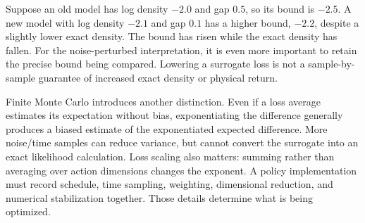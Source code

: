 Suppose an old model has log density $-2.0$ and gap $0.5$, so its bound is $-2.5$. A new model with log density $-2.1$ and gap $0.1$ has a higher bound, $-2.2$, despite a slightly lower exact density. The bound has risen while the exact density has fallen. For the noise-perturbed interpretation, it is even more important to retain the precise bound being compared. Lowering a surrogate loss is not a sample-by-sample guarantee of increased exact density or physical return.

Finite Monte Carlo introduces another distinction. Even if a loss average estimates its expectation without bias, exponentiating the difference generally produces a biased estimate of the exponentiated expected difference. More noise/time samples can reduce variance, but cannot convert the surrogate into an exact likelihood calculation. Loss scaling also matters: summing rather than averaging over action dimensions changes the exponent. A policy implementation must record schedule, time sampling, weighting, dimensional reduction, and numerical stabilization together. Those details determine what is being optimized.

\FloatBarrier
